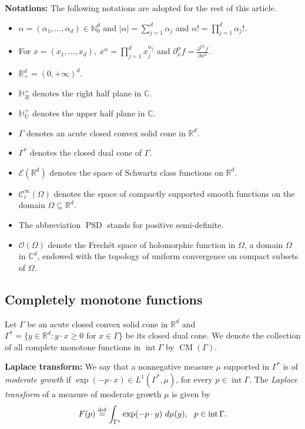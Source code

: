 \documentclass[11pt,reqno]{amsart}
\theoremstyle{plain}
\theoremstyle{definition}
\numberwithin{equation}{section}
\newcommand{\R}{\mathbb{R}}
\newcommand{\C}{\mathbb{C}}
\newcommand{\bydef}{\stackrel{\rm def}{=}}
\begin{document}
    
    \noindent \textbf{Notations:} The following notations are adopted for the rest of this article.
\begin{itemize}
\item[•] $\alpha = (\alpha_1, \dots, \alpha_d) \in \mathbb{N}_0^d \text{ and } |\alpha| = \sum_{j=1}^d \alpha_j$ and $\alpha ! = \prod_{j=1}^d \alpha_j !$.
\item[•] For $x=(x_1, \dots, x_d), \ x^\alpha = \prod_{j=1}^d x_j^{\alpha_j}$ and $\partial^\alpha_x f = \frac{\partial^{|\alpha|}f}{\partial x^\alpha}$.
\item[•] $\mathbb{R}^d_+ = (0, +\infty)^d$.
\item[•] $\mathbb H^+_R$ denotes the right half plane in $\C$.
\item[•] $\mathbb H^+_U$ denotes the upper half plane in $\C$.
\item[•] $\Gamma$ denotes an acute closed convex solid cone in $\mathbb{R}^d$.
\item[•] $\Gamma^*$ denotes the closed dual cone of $\Gamma$.
\item[•] $\mathcal E(\R^d)$ denotes the space of Schwartz class functions on $\R^d$.
\item[•] $\mathcal C^\infty_c(\Omega)$ denotes the space of compactly supported smooth functions on the domain $\Omega\subseteq\R^d$. 
\item[•] The abbreviation $\operatorname{PSD}$ stands for positive semi-definite.
\item[•] $\mathcal{O}(\Omega)$ denote the Frech\'et space of holomorphic function in $\Omega$, a domain $\Omega$ in $\mathbb{C}^d$, endowed with the topology of uniform convergence on compact subsets of $\Omega$. 
\end{itemize}
	\subsection{Completely monotone functions}
	Let $\Gamma$ be an acute closed convex solid cone in $\mathbb{R}^d$ and $\Gamma^*= \{ y\in \mathbb{R}^d : y\cdot x \geq 0 \text{ for } x\in \Gamma\}$ be its closed dual cone. 
	We denote the collection of all complete monotone functions in $\operatorname{int} \Gamma$ by $\operatorname{CM}(\Gamma)$.

\vspace{2mm}
     
    \noindent \textbf{Laplace transform:} We say that a nonnegative measure $\mu$ supported in $\Gamma^*$ is of {\em moderate growth} if $\exp (-p \cdot x) \in L^1(\Gamma^*, \mu)$, for every $p\in \operatorname{int} \Gamma$. The {\em Laplace transform} of a measure of moderate growth $\mu$ is given by
   \begin{align}\label{Eq:LT}
			F(p) \bydef \int_{\Gamma^*} \exp(-p\cdot y)\ d\mu(y), \ \ p \in \operatorname{int} \Gamma.
		\end{align}
\end{document}
